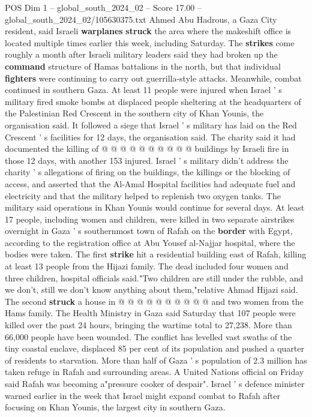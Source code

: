 \begin{textsample}{POS Dim 1 – global\_south\_2024\_02 – Score 17.00 – global\_south\_2024\_02/105630375.txt}
Ahmed Abu Hadrous, a Gaza City resident, said Israeli \textbf{warplanes} \textbf{struck} the area where the makeshift office is located multiple times earlier this week, including Saturday.
The \textbf{strikes} come roughly a month after Israeli military leaders said they had broken up the \textbf{command} structure of Hamas battalions in the north, but that individual \textbf{fighters} were continuing to carry out guerrilla-style attacks.
Meanwhile, combat continued in southern Gaza.
At least 11 people were injured when Israel ' s military fired smoke bombs at displaced people sheltering at the headquarters of the Palestinian Red Crescent in the southern city of Khan Younis, the organisation said.
It followed a siege that Israel ' s military has laid on the Red Crescent ' s facilities for 12 days, the organisation said.
The charity said it had documented the killing of @ @ @ @ @ @ @ @ @ @ buildings by Israeli fire in those 12 days, with another 153 injured.
Israel ' s military didn't address the charity ' s allegations of firing on the buildings, the killings or the blocking of access, and asserted that the Al-Amal Hospital facilities had adequate fuel and electricity and that the military helped to replenish two oxygen tanks.
The military said operations in Khan Younis would continue for several days.
At least 17 people, including women and children, were killed in two separate airstrikes overnight in Gaza ' s southernmost town of Rafah on the \textbf{border} with Egypt, according to the registration office at Abu Yousef al-Najjar hospital, where the bodies were taken.
The first \textbf{strike} hit a residential building east of Rafah, killing at least 13 people from the Hijazi family.
The dead included four women and three children, hospital officials said."Two children are still under the rubble, and we don't, still we don't know anything about them,"relative Ahmad Hijazi said.
The second \textbf{struck} a house in @ @ @ @ @ @ @ @ @ @ and two women from the Hams family.
The Health Ministry in Gaza said Saturday that 107 people were killed over the past 24 hours, bringing the wartime total to 27,238.
More than 66,000 people have been wounded.
The conflict has levelled vast swaths of the tiny coastal enclave, displaced 85 per cent of its population and pushed a quarter of residents to starvation.
More than half of Gaza ' s population of 2.3 million has taken refuge in Rafah and surrounding areas.
A United Nations official on Friday said Rafah was becoming a"pressure cooker of despair".
Israel ' s defence minister warned earlier in the week that Israel might expand combat to Rafah after focusing on Khan Younis, the largest city in southern Gaza.

\end{textsample}
